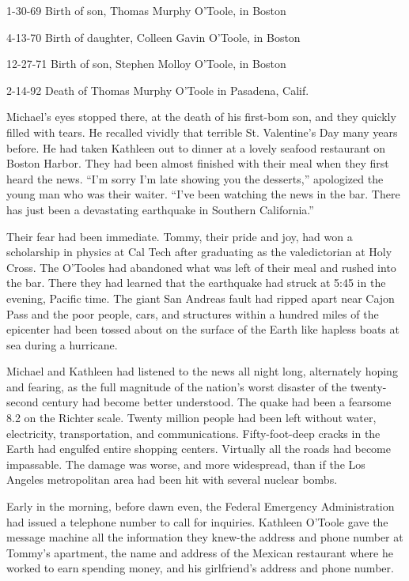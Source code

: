 \documentclass[]{article}
\begin{document}
{1-30-69 Birth of son, Thomas Murphy O’Toole, in Boston

4-13-70 Birth of daughter, Colleen Gavin O’Toole, in Boston

12-27-71 Birth of son, Stephen Molloy O’Toole, in Boston

2-14-92 Death of Thomas Murphy O’Toole in Pasadena, Calif.

Michael’s eyes stopped there, at the death of his first-bom son, and they quickly filled with tears.  He recalled vividly that terrible St.  Valentine’s Day many years before.  He had taken Kathleen out to dinner at a lovely seafood restaurant on Boston Harbor.  They had been almost finished with their meal when they first heard the news.  “I’m sorry I’m late showing you the desserts,” apologized the young man who was their waiter.  “I’ve been watching the news in the bar.  There has just been a devastating earthquake in Southern California.”

Their fear had been immediate.  Tommy, their pride and joy, had won a scholarship in physics at Cal Tech after graduating as the valedictorian at Holy Cross.  The O’Tooles had abandoned what was left of their meal and rushed into the bar.  There they had learned that the earthquake had struck at 5:45 in the evening, Pacific time.  The giant San Andreas fault had ripped apart near Cajon Pass and the poor people, cars, and structures within a hundred miles of the epicenter had been tossed about on the surface of the Earth like hapless boats at sea during a hurricane.

Michael and Kathleen had listened to the news all night long, alternately hoping and fearing, as the full magnitude of the nation’s worst disaster of the twenty-second century had become better understood.  The quake had been a fearsome 8.2 on the Richter scale.  Twenty million people had been left without water, electricity, transportation, and communications.  Fifty-foot-deep cracks in the Earth had engulfed entire shopping centers.  Virtually all the roads had become impassable.  The damage was worse, and more widespread, than if the Los Angeles metropolitan area had been hit with several nuclear bombs.

Early in the morning, before dawn even, the Federal Emergency Administration had issued a telephone number to call for inquiries.  Kathleen O’Toole gave the message machine all the information they knew-the address and phone number at Tommy’s apartment, the name and address of the Mexican restaurant where he worked to earn spending money, and his girlfriend’s address and phone number.

}
\end{document}
